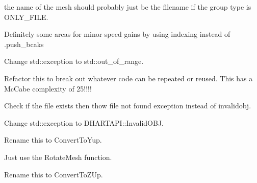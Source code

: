 
\begin{DoxyRefList}
\item[Member \mbox{\hyperlink{a00403_a06c0c11adb62f8b204e42f75ac1990ac}{HF\+::Geometry\+::Load\+Mesh\+Objects}} (std\+::string path, GROUP\+\_\+\+METHOD gm=ONLY\+\_\+\+FILE, bool change\+\_\+coords=false, int scale=1)]\label{a00386__todo000014}%
%
the name of the mesh should probably just be the filename if the group type is ONLY\+\_\+\+FILE. 



Definitely some areas for minor speed gains by using indexing instead of .push\+\_\+bcaks 



Change std\+::exception to std\+::out\+\_\+of\+\_\+range. 



Refactor this to break out whatever code can be repeated or reused. This has a Mc\+Cabe complexity of 25!!!! 
\item[Member \mbox{\hyperlink{a00403_aec1df746155d224838048d3a43c2fe96}{HF\+::Geometry\+::Load\+Raw\+Vertices}} (std\+::string path)]\label{a00386__todo000015}%
%
Check if the file exists then thow file not found exception instead of invalidobj. 
\item[Member \mbox{\hyperlink{a01285_a05d1a3ebca83e841e8902baaecc59930}{HF\+::Geometry\+::Mesh\+Info\texorpdfstring{$<$}{<} numeric\+\_\+type \texorpdfstring{$>$}{>}\+::Add\+Verts}} (const std\+::vector\texorpdfstring{$<$}{<} std\+::array$<$ numeric\+\_\+type, 3 $>$ \texorpdfstring{$>$}{>} \&verts)]\label{a00386__todo000009}%
%
Change std\+::exception to DHARTAPI\+::\+Invalid\+OBJ.  
\item[Member \mbox{\hyperlink{a01285_a5f067dbc661b07c1762b402da03f2041}{HF\+::Geometry\+::Mesh\+Info\texorpdfstring{$<$}{<} numeric\+\_\+type \texorpdfstring{$>$}{>}\+::Convert\+To\+OBJCoordinates}} ()]\label{a00386__todo000011}%
%
Rename this to Convert\+To\+Yup. 



Just use the Rotate\+Mesh function. 
\item[Member \mbox{\hyperlink{a01285_af1152233ddbd8fac736f761347e6d3b8}{HF\+::Geometry\+::Mesh\+Info\texorpdfstring{$<$}{<} numeric\+\_\+type \texorpdfstring{$>$}{>}\+::Convert\+To\+Rhino\+Coordinates}} ()]\label{a00386__todo000010}%
%
Rename this to Convert\+To\+ZUp. 




\end{DoxyRefList}
